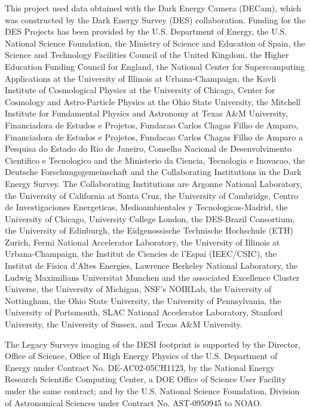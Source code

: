\documentclass[twocolumn]{aastex63}
\begin{document}
This project used data obtained with the Dark Energy Camera (DECam), which was constructed by the Dark Energy Survey (DES) collaboration. Funding for the DES Projects has been provided by the U.S. Department of Energy, the U.S. National Science Foundation, the Ministry of Science and Education of Spain, the Science and Technology Facilities Council of the United Kingdom, the Higher Education Funding Council for England, the National Center for Supercomputing Applications at the University of Illinois at Urbana-Champaign, the Kavli Institute of Cosmological Physics at the University of Chicago, Center for Cosmology and Astro-Particle Physics at the Ohio State University, the Mitchell Institute for Fundamental Physics and Astronomy at Texas A\&M University, Financiadora de Estudos e Projetos, Fundacao Carlos Chagas Filho de Amparo, Financiadora de Estudos e Projetos, Fundacao Carlos Chagas Filho de Amparo a Pesquisa do Estado do Rio de Janeiro, Conselho Nacional de Desenvolvimento Cientifico e Tecnologico and the Ministerio da Ciencia, Tecnologia e Inovacao, the Deutsche Forschungsgemeinschaft and the Collaborating Institutions in the Dark Energy Survey. The Collaborating Institutions are Argonne National Laboratory, the University of California at Santa Cruz, the University of Cambridge, Centro de Investigaciones Energeticas, Medioambientales y Tecnologicas-Madrid, the University of Chicago, University College London, the DES-Brazil Consortium, the University of Edinburgh, the Eidgenossische Technische Hochschule (ETH) Zurich, Fermi National Accelerator Laboratory, the University of Illinois at Urbana-Champaign, the Institut de Ciencies de l’Espai (IEEC/CSIC), the Institut de Fisica d’Altes Energies, Lawrence Berkeley National Laboratory, the Ludwig Maximilians Universitat Munchen and the associated Excellence Cluster Universe, the University of Michigan, NSF’s NOIRLab, the University of Nottingham, the Ohio State University, the University of Pennsylvania, the University of Portsmouth, SLAC National Accelerator Laboratory, Stanford University, the University of Sussex, and Texas A\&M University.

The Legacy Surveys imaging of the DESI footprint is supported by the Director, Office of Science, Office of High Energy Physics of the U.S. Department of Energy under Contract No. DE-AC02-05CH1123, by the National Energy Research Scientific Computing Center, a DOE Office of Science User Facility under the same contract; and by the U.S. National Science Foundation, Division of Astronomical Sciences under Contract No. AST-0950945 to NOAO.
\end{document}
